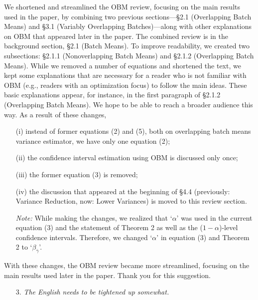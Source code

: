 \documentclass[11pt,notitlepage,onecolumn]{article}
\newcommand{\noi}{\noindent}
\begin{document}
\smallskip 

\noindent 
We shortened and streamlined the OBM review, focusing on the main results used in the paper, by combining two previous sections---\S 2.1 (Overlapping Batch Means) and \S 3.1 (Variably Overlapping Batches)---along with other explanations on OBM that appeared later in the paper. 
The combined review is in the background section, \S 2.1 (Batch Means). 
To improve readability, we created two subsections: \S 2.1.1 (Nonoverlapping Batch Means) and \S 2.1.2 (Overlapping Batch Means). 
While we removed a number of equations and shortened the text, we kept some explanations that are necessary for a reader who is not familiar with OBM (e.g., readers with an optimization focus) to follow the main ideas. 
These basic explanations appear, for instance, in the first paragraph of \S 2.1.2 (Overlapping Batch Means).  
We hope to be able to reach a broader audience this way. 
As a result of these changes, 
\begin{itemize}
	\item[(i)]  instead of former equations (2) and (5), both on overlapping batch means variance estimator, we have only one equation (2); 
	
	\item[(ii)]  the confidence interval estimation using OBM is discussed only once;

	\item[(iii)] the former equation (3) is removed;

	\item[(iv)] the discussion that appeared at the beginning of \S 4.4 (previously: Variance Reduction, now: Lower Variances) is moved to this review section.\medskip 

{\it Note:} While making the changes, we realized that `$\alpha$' was used in the current equation (3) and the statement of Theorem 2 as well as the ($1-\alpha$)-level confidence intervals.  
Therefore, we changed `$\alpha$' in equation (3) and Theorem 2 to `$\beta_{\bar{\gamma}}$'. 
\end{itemize}

\noi
With these changes, the OBM review became more streamlined, focusing on the main results used later in the paper. 
Thank you for this suggestion.
\medskip 


\begin{itemize}
\item[3.] \textit{The English needs to be tightened up somewhat.}
\end{itemize}
\end{document}
